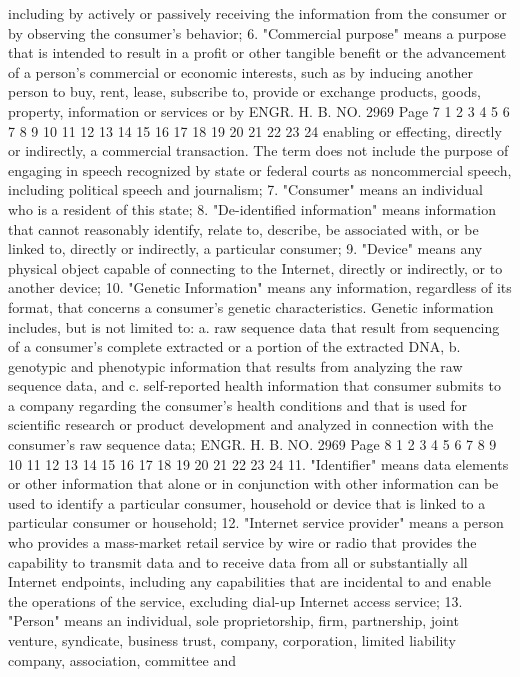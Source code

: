 including by actively or passively receiving the information from
the consumer or by observing the consumer's behavior;
6. "Commercial purpose" means a purpose that is intended to
result in a profit or other tangible benefit or the advancement of a
person's commercial or economic interests, such as by inducing
another person to buy, rent, lease, subscribe to, provide or
exchange products, goods, property, information or services or by 
ENGR. H. B. NO. 2969 Page 7
1
2
3
4
5
6
7
8
9
10
11
12
13
14
15
16
17
18
19
20
21
22
23
24
enabling or effecting, directly or indirectly, a commercial
transaction. The term does not include the purpose of engaging in
speech recognized by state or federal courts as noncommercial
speech, including political speech and journalism;
7. "Consumer" means an individual who is a resident of this
state;
8. "De-identified information" means information that cannot
reasonably identify, relate to, describe, be associated with, or be
linked to, directly or indirectly, a particular consumer;
9. "Device" means any physical object capable of connecting to
the Internet, directly or indirectly, or to another device;
10. "Genetic Information" means any information, regardless of
its format, that concerns a consumer's genetic characteristics.
Genetic information includes, but is not limited to:
a. raw sequence data that result from sequencing of a
consumer's complete extracted or a portion of the
extracted DNA,
b. genotypic and phenotypic information that results from
analyzing the raw sequence data, and
c. self-reported health information that consumer submits
to a company regarding the consumer's health
conditions and that is used for scientific research or
product development and analyzed in connection with
the consumer's raw sequence data;
ENGR. H. B. NO. 2969 Page 8
1
2
3
4
5
6
7
8
9
10
11
12
13
14
15
16
17
18
19
20
21
22
23
24
11. "Identifier" means data elements or other information that
alone or in conjunction with other information can be used to
identify a particular consumer, household or device that is linked
to a particular consumer or household;
12. "Internet service provider" means a person who provides a
mass-market retail service by wire or radio that provides the
capability to transmit data and to receive data from all or
substantially all Internet endpoints, including any capabilities
that are incidental to and enable the operations of the service,
excluding dial-up Internet access service;
13. "Person" means an individual, sole proprietorship, firm,
partnership, joint venture, syndicate, business trust, company,
corporation, limited liability company, association, committee and
